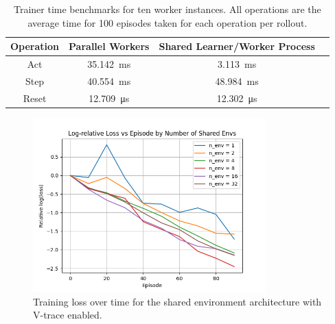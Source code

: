 \begin{table}[h!]
    \centering
    \begin{tabular}{|c|c|c|c|}
        \hline
        \textbf{Operation} & \textbf{Parallel Workers} & \textbf{Shared Learner/Worker Process} \\
        \hline

        Act & \SI{35.142}{\milli\second} & \SI{3.113}{\milli\second} \\
        Step & \SI{40.554}{\milli\second} &\SI{48.984}{\milli\second} \\
        Reset & \SI{12.709}{\micro\second} & \SI{12.302}{\micro\second} \\
        \hline
    \end{tabular}
    \caption{Trainer time benchmarks for ten worker instances. All operations are the average time for 100 episodes taken for each operation per rollout.}
    \label{tab:benchmarks}
\end{table}


\begin{figure}
    \centering
    \includegraphics[width=0.8\textwidth]{img/loss_episode}
    \caption{Training loss over time for the shared environment architecture with V-trace enabled.}
    \label{fig:loss}
\end{figure}


